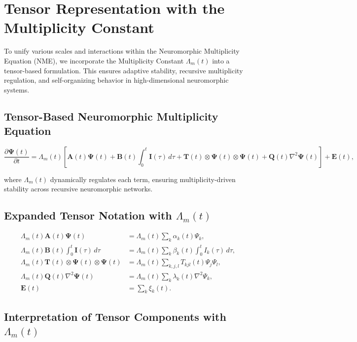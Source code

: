 \documentclass{article}
\theoremstyle{plain}
\begin{document}
\section{Tensor Representation with the Multiplicity Constant}

To unify various scales and interactions within the Neuromorphic Multiplicity Equation (NME), we incorporate the Multiplicity Constant \( \Lambda_m(t) \) into a tensor-based formulation. This ensures adaptive stability, recursive multiplicity regulation, and self-organizing behavior in high-dimensional neuromorphic systems.

\subsection{Tensor-Based Neuromorphic Multiplicity Equation}

\begin{equation}
\frac{\partial \bm{\Psi}(t)}{\partial t} = \Lambda_m(t) \left[ \bm{A}(t) \bm{\Psi}(t) + \bm{B}(t) \int_0^t \bm{I}(\tau) \, d\tau + \bm{T}(t) \otimes \bm{\Psi}(t) \otimes \bm{\Psi}(t) + \bm{Q}(t) \nabla^2 \bm{\Psi}(t) \right] + \bm{E}(t),
\end{equation}

where \( \Lambda_m(t) \) dynamically regulates each term, ensuring multiplicity-driven stability across recursive neuromorphic networks.

\subsection{Expanded Tensor Notation with \( \Lambda_m(t) \)}

\begin{align}
\Lambda_m(t) \bm{A}(t) \bm{\Psi}(t) &= \Lambda_m(t) \sum_k \alpha_k(t) \Psi_k, \\
\Lambda_m(t) \bm{B}(t) \int_0^t \bm{I}(\tau) \, d\tau &= \Lambda_m(t) \sum_k \beta_k(t) \int_0^t I_k(\tau) \, d\tau, \\
\Lambda_m(t) \bm{T}(t) \otimes \bm{\Psi}(t) \otimes \bm{\Psi}(t) &= \Lambda_m(t) \sum_{k,j,l} T_{kjl}(t) \Psi_j \Psi_l, \\
\Lambda_m(t) \bm{Q}(t) \nabla^2 \bm{\Psi}(t) &= \Lambda_m(t) \sum_k \lambda_k(t) \nabla^2 \Psi_k, \\
\bm{E}(t) &= \sum_k \xi_k(t).
\end{align}

\subsection{Interpretation of Tensor Components with \( \Lambda_m(t) \)}
\end{document}
